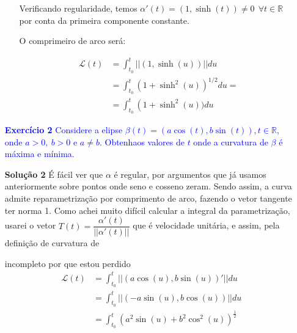 \documentclass[12pt,letterpaper]{article}
\newcommand\lcur{\mathcal{L}}
\newcommand{\ex}[1]{\textcolor{blue}{\textbf{Exercício #1}}}
\newcommand{\sol}[1]{\textbf{Solução #1}}
\begin{document}
\begin{enumerate}
\begin{itemize}
Verificando regularidade, temos $\alpha'(t)=(1,\sinh(t))\neq0~~\forall t\in\mathbb{R}$ por conta da primeira componente constante.

O comprimeiro de arco será:

\begin{align*}
	\lcur(t)&=\int_{t_0}^{t}||(1,\sinh(u))||du\\
	&=\int_ {t_0}^{t}(1+\sinh^2(u))^{1/2}du=\\
	&=\int_ {t_0}^{t}\left(1+\sinh^2(u))du
\end{align*}
		\end{itemize}
	
		\item[\ex{2}] \textcolor{blue}{Considere a elipse $\beta(t) =(a\cos(t),b\sin(t)),t\in\mathbb{R}$, onde $a >0,~b >0$ e $a\neq b$. Obtenhaos valores de $t$ onde a curvatura de $\beta$ é máxima e mínima.}
		
		\item[\sol{2}] É fácil ver que $\alpha$ é regular, por argumentos que já usamos anteriormente sobre pontos onde seno e cosseno zeram. Sendo assim, a curva admite reparametrização por comprimento de arco, fazendo o vetor tangente ter norma 1. Como achei muito difícil calcular a integral da parametrização, usarei o vetor  $T(t)=\dfrac{\alpha'(t)}{||\alpha'(t)||}$ que é velocidade unitária, e assim, pela definição de curvatura de \cite{pressley2001elementary} 
		
		
		incompleto por que estou perdido
		\begin{align*}
			\lcur(t)&=\int_{t_0}^t||(a\cos(u),b\sin(u))'||du\\
			&=\int_{t_0}^t||(-a\sin(u),b\cos(u))||du\\
			&=\int_{t_0}^t\left(a^2\sin(u)+b^2\cos^2(u)\right)^{\frac12}
		\end{align*}
		
		
		
		
		
		
	\end{enumerate}
	
	\newpage
	
	
	
\end{document}
